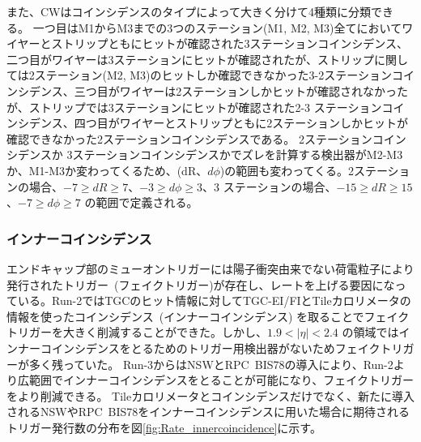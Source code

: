 また、CWはコインシデンスのタイプによって大きく分けて4種類に分類できる。
一つ目はM1からM3までの3つのステーション(M1, M2, M3)全てにおいてワイヤーとストリップともにヒットが確認された3ステーションコインシデンス、二つ目がワイヤーは3ステーションにヒットが確認されたが、ストリップに関しては2ステーション(M2, M3)のヒットしか確認できなかった3-2ステーションコインシデンス、三つ目がワイヤーは2ステーションしかヒットが確認されなかったが、ストリップでは3ステーションにヒットが確認された2-3 ステーションコインシデンス、四つ目がワイヤーとストリップともに2ステーションしかヒットが確認できなかった2ステーションコインシデンスである。
2ステーションコインシデンスか 3ステーションコインシデンスかでズレを計算する検出器がM2-M3か、M1-M3か変わってくるため、(dR、$d\phi$)の範囲も変わってくる。2ステーションの場合、$−7 \geq dR \geq 7$、$−3 \geq d\phi \geq 3$、3 ステーションの場合、$−15 \geq dR \geq 15$、$−7 \geq d\phi \geq 7$ の範囲で定義される。




\subsubsection{インナーコインシデンス}
エンドキャップ部のミューオントリガーには陽子衝突由来でない荷電粒子により発行されたトリガー~(フェイクトリガー)が存在し、レートを上げる要因になっている。Run-2ではTGCのヒット情報に対してTGC-EI/FIとTileカロリメータの情報を使ったコインシデンス~(インナーコインシデンス) を取ることでフェイクトリガーを大きく削減することができた。しかし、$1.9 < |\eta| < 2.4$ の領域ではインナーコインシデンスをとるためのトリガー用検出器がないためフェイクトリガーが多く残っていた。
Run-3からはNSWとRPC~BIS78の導入により、Run-2より広範囲でインナーコインシデンスをとることが可能になり、フェイクトリガーをより削減できる。
Tileカロリメータとコインシデンスだけでなく、新たに導入されるNSWやRPC~BIS78をインナーコインシデンスに用いた場合に期待されるトリガー発行数の分布を図\ref{fig:Rate_innercoincidence}に示す。

